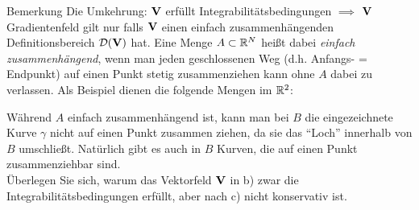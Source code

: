 \documentclass{scrartcl}
\newcommand{\DD}{\mathcal{D}}
\begin{document}
\begin{remark}{Bemerkung}
  Die Umkehrung: $\mathbf{V}$ erfüllt Integrabilitätsbedingungen $\implies$ $\mathbf{V}$ Gradientenfeld gilt nur falls $\mathbf{V}$ einen einfach zusammenhängenden Definitionsbereich $\DD(\mat V)$ hat.
  Eine Menge $A \subset \mathbb{R}^N$ heißt dabei \emph{einfach zusammenhängend}, wenn man jeden geschlossenen Weg (d.h. Anfangs- = Endpunkt) auf einen Punkt stetig zusammenziehen kann ohne $A$ dabei zu verlassen. Als Beispiel dienen die folgende Mengen im $\mathbb{R}^2$:

  \begin{center}
  \end{center}
  Während $A$ einfach zusammenhängend ist, kann man bei $B$ die eingezeichnete Kurve $\gamma$ nicht auf einen Punkt zusammen ziehen, da sie das ``Loch'' innerhalb von $B$ umschließt.
  Natürlich gibt es auch in $B$ Kurven, die auf einen Punkt zusammenziehbar sind.\\

  Überlegen Sie sich, warum das Vektorfeld $\mathbf{V}$ in b) zwar die Integrabilitätsbedingungen erfüllt, aber nach c) nicht konservativ ist.
\end{remark}
\end{document}
